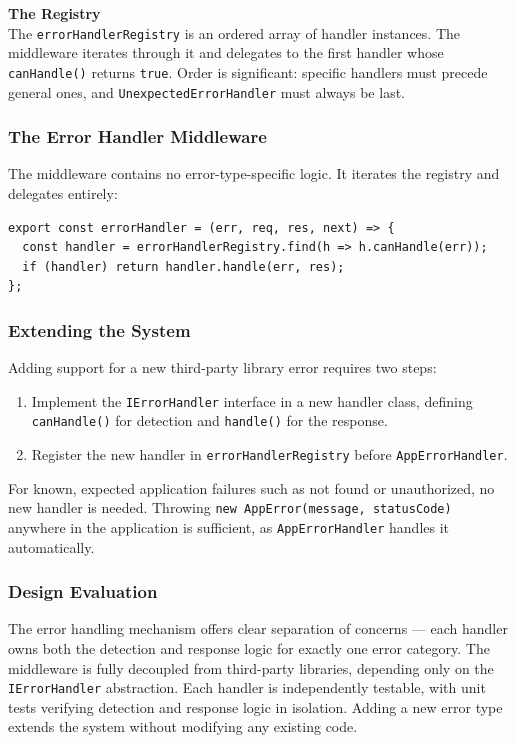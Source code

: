 \textbf{The Registry}\\
The \texttt{errorHandlerRegistry} is an ordered array of handler instances. The middleware iterates through it and delegates to the first handler whose \texttt{canHandle()} returns \texttt{true}. Order is 
significant: specific handlers must precede general ones, and \texttt{UnexpectedErrorHandler} must always be last.

\subsubsection{The Error Handler Middleware}
The middleware contains no error-type-specific logic. It iterates the registry and delegates entirely:

\begin{lstlisting}
export const errorHandler = (err, req, res, next) => {
  const handler = errorHandlerRegistry.find(h => h.canHandle(err));
  if (handler) return handler.handle(err, res);
};
\end{lstlisting}

\subsubsection{Extending the System}
Adding support for a new third-party library error requires two steps:

\begin{enumerate}
    \item Implement the \texttt{IErrorHandler} interface in a new handler class, defining \texttt{canHandle()} for detection and \texttt{handle()} for the response. \item Register the new handler in \texttt{errorHandlerRegistry} before \texttt{AppErrorHandler}.
\end{enumerate}

For known, expected application failures such as not found or unauthorized, no new handler is needed. Throwing \texttt{new AppError(message, statusCode)} anywhere in the application is sufficient, as \texttt{AppErrorHandler} handles it automatically.

\subsubsection{Design Evaluation}
The error handling mechanism offers clear separation of concerns — each handler owns both the detection and response logic for exactly one error category. The middleware is fully decoupled from third-party libraries, 
depending only on the \texttt{IErrorHandler} abstraction. Each handler is independently testable, with unit tests verifying detection and response logic in isolation. Adding a new error type extends the system 
without modifying any existing code.
